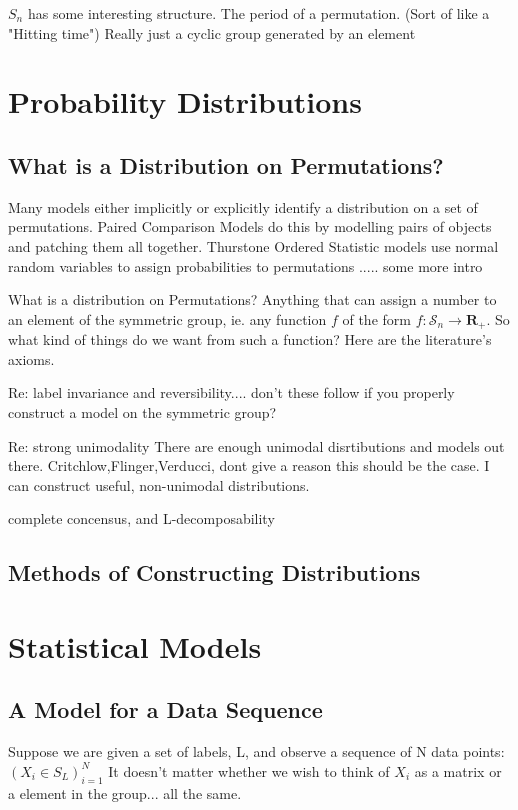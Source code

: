 \documentclass{article}
\theoremstyle{definition}
\begin{document}
$S_n$ has some interesting structure.
The period of a permutation. (Sort of like a "Hitting time")
Really just a cyclic group generated by an element

\section{Probability Distributions}
\subsection{What is a Distribution on Permutations?}
Many models either implicitly or explicitly identify a distribution on a set of permutations. Paired Comparison Models do this by modelling pairs of objects and patching them all together. Thurstone Ordered Statistic models use normal random variables to assign probabilities to permutations ..... some more intro

What is a distribution on Permutations? Anything that can assign a number to an element of the symmetric group, ie. any function $f$ of the form \(f:\mathcal{S}_n \rightarrow \mathbf{R}_+ \). So what kind of things do we want from such a function? Here are the literature's axioms. 

Re: label invariance and reversibility....
don't these follow if you properly construct a model on the symmetric group?

Re: strong unimodality
There are enough unimodal disrtibutions and models out there. Critchlow,Flinger,Verducci, dont give a reason this should be the case. I can construct useful, non-unimodal distributions.
    
complete concensus, and L-decomposability

\subsection{Methods of Constructing Distributions}

\section{Statistical Models}
\subsection{A Model for a Data Sequence}
Suppose we are given a set of labels, L, and observe a sequence of N data points: $ (X_i \in S_L)_{i=1}^N$
It doesn't matter whether we wish to think of $X_i$ as a matrix or a element in the group... all the same.
\end{document}
